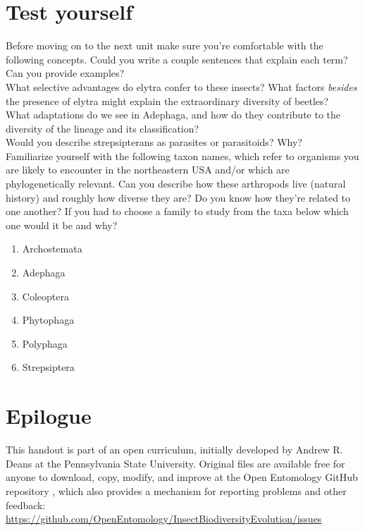\documentclass[letterpaper, 11pt]{article}
\begin{document}
\clearpage
\section*{Test yourself}
Before moving on to the next unit make sure you're comfortable with the following concepts. Could you write a couple sentences that explain each term? Can you provide examples?\\

\noindent{}What selective advantages do elytra confer to these insects? What factors \textit{besides} the presence of elytra might explain the extraordinary diversity of beetles?\\

\noindent{}What adaptations do we see in Adephaga, and how do they contribute to the diversity of the lineage and its classification?\\

\noindent{}Would you describe strepsipterans as parasites or parasitoids? Why?\\

\noindent{}Familiarize yourself with the following taxon names, which refer to organisms you are likely to encounter in the northeastern USA and/or which are phylogenetically relevant. Can you describe how these arthropods live (natural history) and roughly how diverse they are? Do you know how they're related to one another? If you had to choose a family to study from the taxa below which one would it be and why?
\begin{enumerate} 
\item Archostemata
\item Adephaga
\item Coleoptera  
\item Phytophaga
\item Polyphaga
\item Strepsiptera
\end{enumerate}

\FloatBarrier
\clearpage

\section*{Epilogue}
This handout is part of an open curriculum, initially developed by Andrew R. Deans at the Pennsylvania State University. Original files are available free for anyone to download, copy, modify, and improve at the Open Entomology GitHub repository \citep{ENT532}, which also provides a mechanism for reporting problems and other feedback:\\
\url{https://github.com/OpenEntomology/InsectBiodiversityEvolution/issues}
\end{document}
